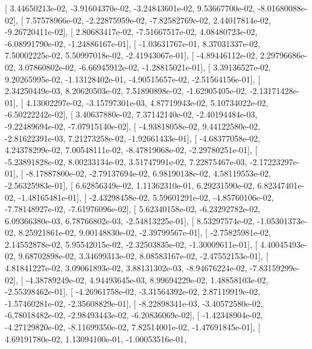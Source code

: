 \documentclass{article}
\begin{document}
       [  3.44650213e-02,  -3.91604370e-02,  -3.24843601e-02,
          9.53667700e-02,  -8.01680088e-02],
       [  7.57578966e-02,  -2.22875959e-02,  -7.82582769e-02,
          2.44017814e-02,  -9.26720411e-02],
       [  2.80683417e-02,  -7.51667517e-02,   4.08480723e-02,
         -6.08991790e-02,  -1.24886167e-01],
       [ -1.03631767e-01,   8.37031337e-02,   7.50002225e-02,
          5.50997018e-02,  -2.41943067e-01],
       [ -4.89446112e-02,   2.29796686e-02,   3.07860802e-02,
         -6.66945912e-02,  -1.28815021e-01],
       [  3.39136527e-02,   9.20265995e-02,  -1.13128402e-01,
         -4.90515657e-02,  -2.51564156e-01],
       [  2.34250449e-03,   8.20620503e-02,   7.51890898e-02,
         -1.62905405e-02,  -2.13171428e-01],
       [  4.13002297e-02,  -3.15797301e-03,   4.87719943e-02,
          5.10734022e-02,  -6.50222242e-02],
       [  3.40637880e-02,   7.37142140e-02,  -2.40194484e-03,
         -9.22489694e-02,  -7.07915140e-02],
       [ -4.93818058e-02,   9.44122580e-02,  -2.81622391e-03,
          7.21273258e-02,  -1.92661433e-01],
       [ -4.68377058e-02,   4.24378299e-02,   7.00548111e-02,
         -8.47819068e-02,  -2.29780251e-01],
       [ -5.23891828e-02,   8.00233134e-02,   3.51747991e-02,
          7.22875467e-03,  -2.17223297e-01],
       [ -8.17887800e-02,  -2.79137694e-02,   6.98190138e-02,
          4.58119553e-02,  -2.56325983e-01],
       [  6.62856349e-02,   1.11362310e-01,   6.29231590e-02,
          6.82347401e-02,  -1.48165481e-01],
       [ -2.43298458e-02,   5.59601291e-02,  -4.85760106e-02,
         -7.78148927e-02,  -7.61976096e-02],
       [  5.62340158e-02,  -6.23292782e-02,   6.09366380e-03,
          6.78766802e-03,  -2.54813225e-01],
       [  8.53297574e-02,  -1.05301373e-02,   8.25921861e-02,
          9.00148830e-02,  -2.39799567e-01],
       [ -2.75825981e-02,   2.14552878e-02,   5.95542015e-02,
         -2.32503835e-02,  -1.30009611e-01],
       [  4.40045493e-02,   9.68702898e-02,   3.34699313e-02,
          8.08583167e-02,  -2.47552153e-01],
       [  4.81841227e-02,   3.09061893e-02,   3.88131302e-03,
         -8.94676224e-02,  -7.83159299e-02],
       [ -4.38789249e-02,   4.94493645e-03,   8.99694229e-02,
          1.48858103e-02,  -2.55398462e-01],
       [ -4.26961758e-02,  -3.31564392e-02,   2.87119919e-02,
         -1.57460281e-02,  -2.35608829e-01],
       [ -8.22898341e-03,  -3.40572580e-02,  -6.78018482e-02,
         -2.98493443e-02,  -6.20836069e-02],
       [ -1.42348904e-02,  -4.27129820e-02,  -8.11699350e-02,
          7.82514001e-02,  -1.47691845e-01],
       [  4.69191780e-02,   1.13094100e-01,  -1.00053516e-01,
\end{document}
